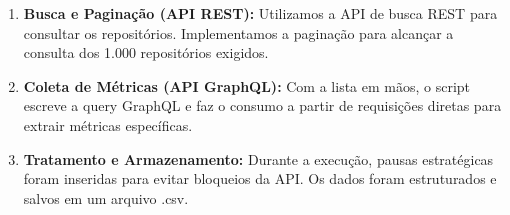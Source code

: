 \documentclass[12pt,a4paper]{article}
\begin{document}
\begin{enumerate}
    \item \textbf{Busca e Paginação (API REST):} Utilizamos a API de busca REST para consultar os repositórios. Implementamos a paginação para alcançar a consulta dos 1.000 repositórios exigidos.
    \item \textbf{Coleta de Métricas (API GraphQL):} Com a lista em mãos, o script escreve a query GraphQL e faz o consumo a partir de requisições diretas para extrair métricas específicas.
    \item \textbf{Tratamento e Armazenamento:} Durante a execução, pausas estratégicas foram inseridas para evitar bloqueios da API. Os dados foram estruturados e salvos em um arquivo .csv.
\end{enumerate}
\end{document}
